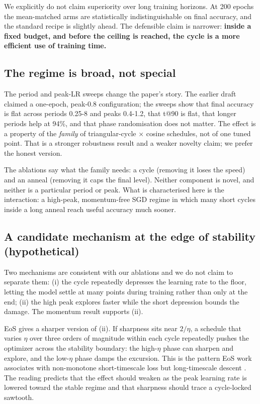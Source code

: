 \documentclass[11pt,a4paper]{article}
\begin{document}
We explicitly do not claim superiority over long training horizons. At 200 epochs the mean-matched arms are statistically indistinguishable on final accuracy, and the standard recipe is slightly ahead. The defensible claim is narrower: \textbf{inside a fixed budget, and before the ceiling is reached, the cycle is a more efficient use of training time.}

\subsection{The regime is broad, not special}
The period and peak-LR sweeps change the paper's story. The earlier draft claimed a one-epoch, peak-0.8 configuration; the sweeps show that final accuracy is flat across periods 0.25-8 and peaks 0.4-1.2, that t@90 is flat, that longer periods help at 94\%, and that phase randomisation does not matter. The effect is a property of the \textit{family} of triangular-cycle × cosine schedules, not of one tuned point. That is a stronger robustness result and a weaker novelty claim; we prefer the honest version.

The ablations say what the family needs: a cycle (removing it loses the speed) and an anneal (removing it caps the final level). Neither component is novel, and neither is a particular period or peak. What is characterised here is the interaction: a high-peak, momentum-free SGD regime in which many short cycles inside a long anneal reach useful accuracy much sooner.

\subsection{A candidate mechanism at the edge of stability (hypothetical)}
Two mechanisms are consistent with our ablations and we do not claim to separate them: (i) the cycle repeatedly depresses the learning rate to the floor, letting the model settle at many points during training rather than only at the end; (ii) the high peak explores faster while the short depression bounds the damage. The momentum result supports (ii).

EoS gives a sharper version of (ii). If sharpness sits near $2/\eta$, a schedule that varies $\eta$ over three orders of magnitude within each cycle repeatedly pushes the optimizer across the stability boundary: the high-$\eta$ phase can sharpen and explore, and the low-$\eta$ phase damps the excursion. This is the pattern EoS work associates with non-monotone short-timescale loss but long-timescale descent \cite{ref6,ref7,ref8}. The reading predicts that the effect should weaken as the peak learning rate is lowered toward the stable regime and that sharpness should trace a cycle-locked sawtooth.
\end{document}
